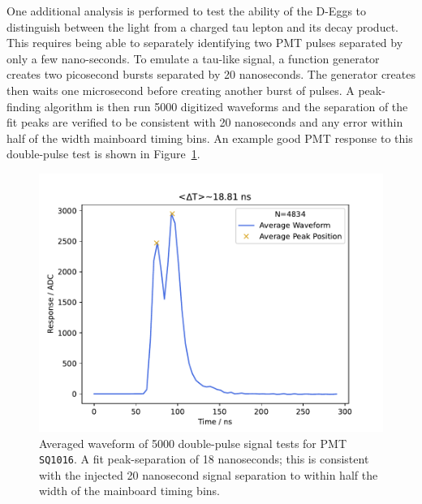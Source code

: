\documentclass[main.tex]{subfiles}
\begin{document}
One additional analysis is performed to test the ability of the D-Eggs to distinguish between the light from a charged tau lepton and its decay product. 
This requires being able to separately identifying two PMT pulses separated by only a few nano-seconds. 
To emulate a tau-like signal, a function generator creates two picosecond bursts separated by 20 nanoseconds. 
The generator creates then waits one microsecond before creating another burst of pulses. 
A peak-finding algorithm is then run 5000 digitized waveforms and the separation of the fit peaks are verified to be consistent with 20 nanoseconds and any error within half of the width mainboard timing bins.
An example good PMT response to this double-pulse test is shown in Figure~\ref{fig:double_pulse}.

\begin{figure}
    \centering
    \includegraphics[width=0.8\linewidth]{figures/ave_wf_bl_sub_every_wf_DEgg2021-3-082_SQ1016.pdf}
    \caption{Averaged waveform of 5000 double-pulse signal tests for PMT \texttt{SQ1016}. A fit peak-separation of 18 nanoseconds; this is consistent with the injected 20 nanosecond signal separation to within half the width of the mainboard timing bins.}\label{fig:double_pulse}
\end{figure}
\end{document}
